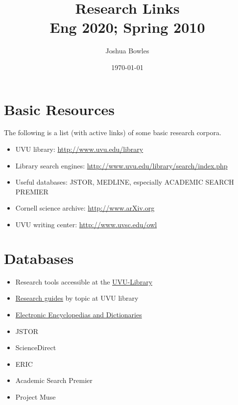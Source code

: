 \documentclass[11pt]{article}
\author{Joshua Bowles}
\title{Research Links\\
\small Eng 2020; Spring 2010}
\date{\today}
\begin{document}
\maketitle


  \section{Basic Resources}
The following is a list (with active links) of some basic research corpora.
  \begin{itemize}
\item UVU library: \href{http://www.uvu.edu/library}{http://www.uvu.edu/library}
\item Library search engines: \href{http://www.uvu.edu/library/search/index.php}
{http://www.uvu.edu/library/search/index.php}
\item Useful databases: JSTOR, MEDLINE, especially ACADEMIC SEARCH PREMIER
\item Cornell science archive: \href{http://www.arXiv.org}{http://www.arXiv.org}
\item UVU writing center: \href{http://www.uvsc.edu/owl}{http://www.uvsc.edu/owl}
\end{itemize}

\section{Databases}\begin{itemize}  
\item Research tools accessible at the \href{http://www.uvu.edu/library/researchtools/index.html}{UVU-Library}
\item \href{http://www.uvu.edu/library/guides/index.html}{Research guides} by topic at UVU library
\item \href{http://www.uvu.edu/library/researchtools/electronic_encyclopedias.html}{Electronic Encyclopedias and 
Dictionaries}
\item JSTOR 
\item ScienceDirect 
\item ERIC 
\item Academic Search Premier 
\item Project Muse
\end{itemize}
\end{document}
